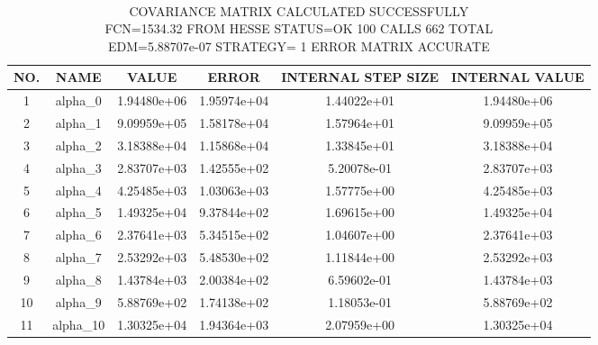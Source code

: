   
\begin{sidewaystable}[!ht]
\centering
\begin{tabular}{c c c c c c}
  
  NO.  & NAME    &  VALUE        &    ERROR    &   INTERNAL STEP SIZE  &     INTERNAL VALUE   \\ \hline
   1 &  alpha\_0   &   1.94480e+06  & 1.95974e+04  &  1.44022e+01  & 1.94480e+06 \\ 
   2 &  alpha\_1   &   9.09959e+05  & 1.58178e+04  &  1.57964e+01  & 9.09959e+05 \\ 
   3 &  alpha\_2   &   3.18388e+04  & 1.15868e+04  &  1.33845e+01  & 3.18388e+04 \\ 
   4 &  alpha\_3   &   2.83707e+03  & 1.42555e+02  &  5.20078e-01  & 2.83707e+03 \\ 
   5 &  alpha\_4   &   4.25485e+03  & 1.03063e+03  &  1.57775e+00  & 4.25485e+03 \\ 
   6 &  alpha\_5   &   1.49325e+04  & 9.37844e+02  &  1.69615e+00  & 1.49325e+04 \\ 
   7 &  alpha\_6   &   2.37641e+03  & 5.34515e+02  &  1.04607e+00  & 2.37641e+03 \\ 
   8 &  alpha\_7   &   2.53292e+03  & 5.48530e+02  &  1.11844e+00  & 2.53292e+03 \\ 
   9 &  alpha\_8   &   1.43784e+03  & 2.00384e+02  &  6.59602e-01  & 1.43784e+03 \\ 
  10 &  alpha\_9  &    5.88769e+02 &  1.74138e+02 &   1.18053e-01 &  5.88769e+02 \\ 
  11 &  alpha\_10  &    1.30325e+04 &  1.94364e+03 &   2.07959e+00 &  1.30325e+04 \\ \hline

 \end{tabular}
 \caption{\\ COVARIANCE MATRIX CALCULATED SUCCESSFULLY\\
 FCN=1534.32 FROM HESSE     STATUS=OK            100 CALLS         662 TOTAL\\
                     EDM=5.88707e-07    STRATEGY= 1      ERROR MATRIX ACCURATE \\}
\end{sidewaystable}
 
